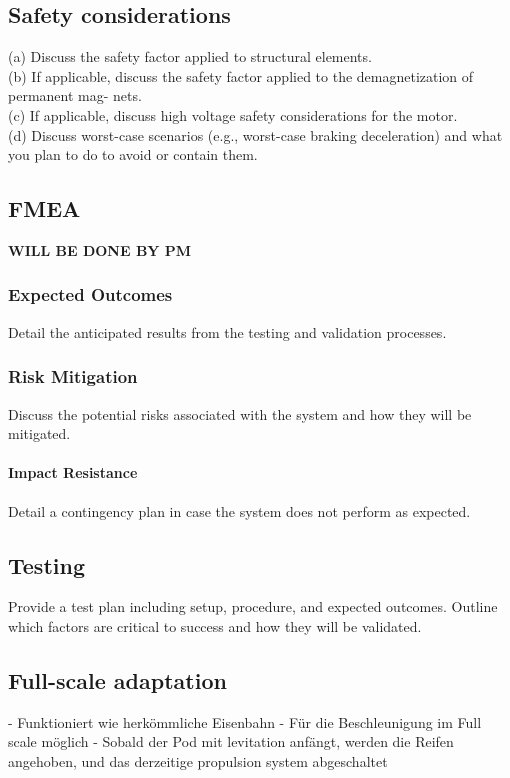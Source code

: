 \subsection{Safety considerations }
(a) Discuss the safety factor applied to structural elements. \\
(b) If applicable, discuss the safety factor applied to the demagnetization of permanent mag-
nets.\\
(c) If applicable, discuss high voltage safety considerations for the motor.\\
(d) Discuss worst-case scenarios (e.g., worst-case braking deceleration) and what you plan
to do to avoid or contain them.\\

\subsection{FMEA}
\textbf{WILL BE DONE BY PM}

\subsubsection{Expected Outcomes}
Detail the anticipated results from the testing and validation processes.

\subsubsection{Risk Mitigation}
Discuss the potential risks associated with the system and how they will be mitigated.

\paragraph{Impact Resistance}
Detail a contingency plan in case the system does not perform as expected.


\subsection{Testing}
Provide a test plan including setup, procedure, and expected outcomes.
Outline which factors are critical to success and how they will be validated.


\subsection{Full-scale adaptation}
- Funktioniert wie herkömmliche Eisenbahn
- Für die Beschleunigung im Full scale möglich
- Sobald der Pod mit levitation anfängt, werden die Reifen angehoben, und das derzeitige propulsion system abgeschaltet

